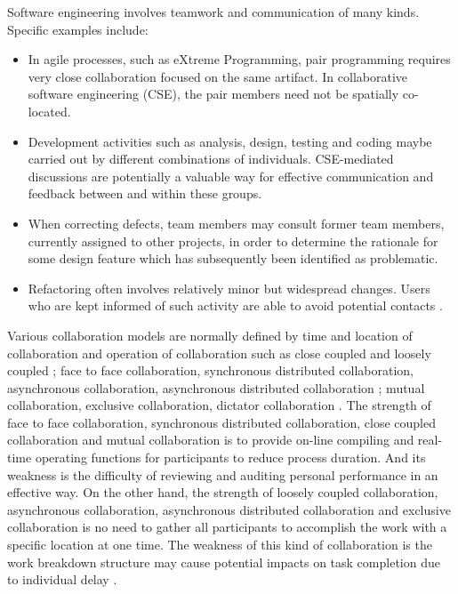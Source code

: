 Software engineering involves teamwork and communication of many kinds. Specific examples include:
\begin{itemize}
\item In agile processes, such as eXtreme Programming, pair programming requires very close collaboration focused on the same artifact. In collaborative software engineering (CSE), the pair members need not be spatially co-located.
\end{itemize}
\begin{itemize}
\item Development activities such as analysis, design, testing and coding maybe carried out by different combinations of individuals. CSE-mediated discussions are potentially a valuable way for effective communication and feedback between and within these groups.
\end{itemize}
\begin{itemize}
\item When correcting defects, team members may consult former team members, currently assigned to other projects, in order to determine the rationale for some design feature which has subsequently been identified as problematic.
\end{itemize}
\begin{itemize}
\item Refactoring often involves relatively minor but widespread changes. Users who are kept informed of such activity are able to avoid potential contacts \cite{cook2005modelling}.
\end{itemize}

Various collaboration models are normally defined by time and location of collaboration and operation of collaboration such as close coupled and loosely coupled \cite{kvan2000collaborative}; face to face collaboration, synchronous distributed collaboration, asynchronous collaboration, asynchronous distributed collaboration \cite{anumba2002collaborative}; mutual collaboration, exclusive collaboration, dictator collaboration \cite{maher1996experimental}. The strength of face to face collaboration, synchronous distributed collaboration, close coupled collaboration and mutual collaboration is to provide on-line compiling and real-time operating functions for participants to reduce process duration. And its weakness is the difficulty of reviewing and auditing personal performance in an effective way. On the other hand, the strength of loosely coupled collaboration, asynchronous collaboration, asynchronous distributed collaboration and exclusive collaboration is no need to gather all participants to accomplish the work with a specific location at one time. The weakness of this kind of collaboration is the work breakdown structure may cause potential impacts on task completion due to individual delay \cite{kvan2000collaborative,anumba2002collaborative,maher1996experimental}.

